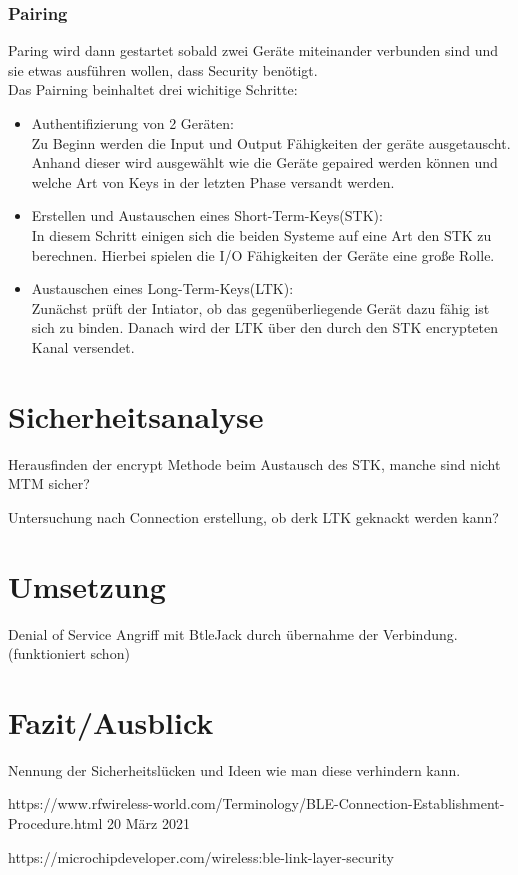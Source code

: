 \documentclass[a4paper,11pt,singlespacing]{article}
\begin{document}
		\subsubsection{Pairing}
		Paring wird dann gestartet sobald zwei Geräte miteinander verbunden sind und sie etwas ausführen wollen, dass Security benötigt.\\
		Das Pairning beinhaltet drei wichitige Schritte:
		\begin{itemize}
			\item Authentifizierung von 2 Geräten: \\
			Zu Beginn werden die Input und Output Fähigkeiten der geräte ausgetauscht. Anhand dieser wird ausgewählt wie die Geräte gepaired werden können und welche Art von Keys in der letzten Phase versandt werden.
			\item Erstellen und Austauschen eines Short-Term-Keys(STK): \\
			In diesem Schritt einigen sich die beiden Systeme auf eine Art den STK zu berechnen. Hierbei spielen die I/O Fähigkeiten der Geräte eine große Rolle.
			\item Austauschen eines Long-Term-Keys(LTK): \\
			Zunächst prüft der Intiator, ob das gegenüberliegende Gerät dazu fähig ist sich zu binden. Danach wird der LTK über den durch den STK encrypteten Kanal versendet.
		\end{itemize}
	
	\section{Sicherheitsanalyse}
	
		Herausfinden der encrypt Methode beim Austausch des STK, manche sind nicht MTM sicher?
		
		Untersuchung nach Connection erstellung, ob derk LTK geknackt werden kann?
		
		
	\section{Umsetzung}
		
		Denial of Service Angriff mit BtleJack durch übernahme der Verbindung. (funktioniert schon)
		
	\section{Fazit/Ausblick}
		Nennung der Sicherheitslücken und Ideen wie man diese verhindern kann.
	
	
	
	
	
	
	
	https://www.rfwireless-world.com/Terminology/BLE-Connection-Establishment-Procedure.html 20 März 2021
	
	https://microchipdeveloper.com/wireless:ble-link-layer-security
	
\end{document}
